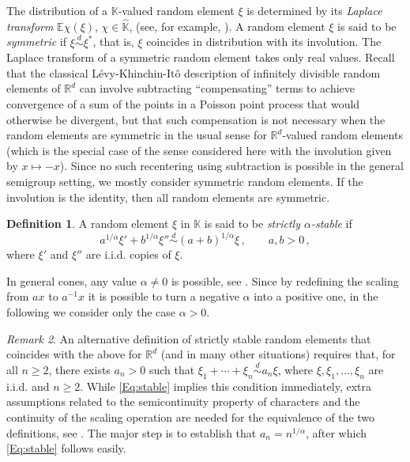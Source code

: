 \documentclass[12pt]{amsart}
\numberwithin{equation}{section}
\numberwithin{figure}{section}
\theoremstyle{plain} \newtheorem{theorem}{Theorem}[section]
\theoremstyle{plain} \newtheorem{proposition}[theorem]{Proposition}
\theoremstyle{plain} \newtheorem{lemma}[theorem]{Lemma}
\theoremstyle{plain} \newtheorem{corollary}[theorem]{Corollary}
\theoremstyle{definition} \newtheorem{definition}[theorem]{Definition}
\theoremstyle{definition} \newtheorem{notation}[theorem]{Notation}
\theoremstyle{remark} \newtheorem{remark}[theorem]{Remark}
\theoremstyle{remark} \newtheorem{example}[theorem]{Example}
\theoremstyle{definition} \newtheorem{assumption}{Assumption}
\newcommand{\bE}{\mathbb{E}}
\newcommand{\bK}{\mathbb{K}}
\newcommand{\bR}{\mathbb{R}}
\newcommand{\bKH}{\hat{\bK}}
\newcommand{\eqd}{\overset{d}{\sim}}
\begin{document}
The distribution of a $\bK$-valued random element $\xi$ is
determined by its \emph{Laplace transform} $\bE\chi(\xi)$,
$\chi\in\bKH$, (see, for example, \cite[Th.~5.4]{dav:mol:zuy08}).
A random element $\xi$ is said to be \emph{symmetric} if
$\xi\eqd\xi^*$, that is, $\xi$ coincides in distribution with its
involution. The Laplace transform of a symmetric random element takes
only real values. Recall that the classical L\'evy-Khinchin-It\^o
description of infinitely divisible random elements of $\bR^d$ can
involve subtracting ``compensating'' terms to achieve convergence
of a sum of the points in a Poisson point process that would otherwise
be divergent, but that such compensation is not necessary when the
random elements are symmetric in the usual sense for $\bR^d$-valued
random elements (which is the special case of the sense considered
here with the involution given by $x \mapsto -x$).  Since no such
recentering using subtraction is possible in the general semigroup
setting, we mostly consider symmetric random elements. If the
involution is the identity, then all random elements are symmetric.

\begin{definition}
  A random element $\xi$ in $\bK$ is said to be \emph{strictly
    $\alpha$-stable} if
  \begin{equation}
    \label{Eq:stable}
    a^{1/\alpha}\xi'+b^{1/\alpha}\xi''
    \eqd (a+b)^{1/\alpha}\xi\,,\qquad a,b>0\,,
  \end{equation}
  where $\xi'$ and $\xi''$ are i.i.d. copies of $\xi$.
\end{definition}

In general cones, any value $\alpha\neq0$ is possible, see
\cite{dav:mol:zuy08}. Since by redefining the scaling from $ax$ to
$a^{-1}x$ it is possible to turn a negative $\alpha$ into a positive
one, in the following we consider only the case $\alpha>0$.

\begin{remark}
  An alternative definition of strictly stable random elements that
  coincides with the above for $\bR^d$ (and in many other situations)
  requires that, for all $n\geq2$, there exists $a_n>0$ such that
  $\xi_1+\cdots+\xi_n\eqd a_n\xi$, where $\xi,\xi_1,\dots,\xi_n$ are
  i.i.d. and $n\geq2$. While \eqref{Eq:stable} implies this condition
  immediately, extra assumptions related to the semicontinuity
  property of characters and the continuity of the scaling operation
  are needed for the equivalence of the two definitions, see
  \cite[Th.~5.16]{dav:mol:zuy08}. The major step is to establish that
  $a_n=n^{1/\alpha}$, after which \eqref{Eq:stable} follows easily.
\end{remark}
\end{document}
